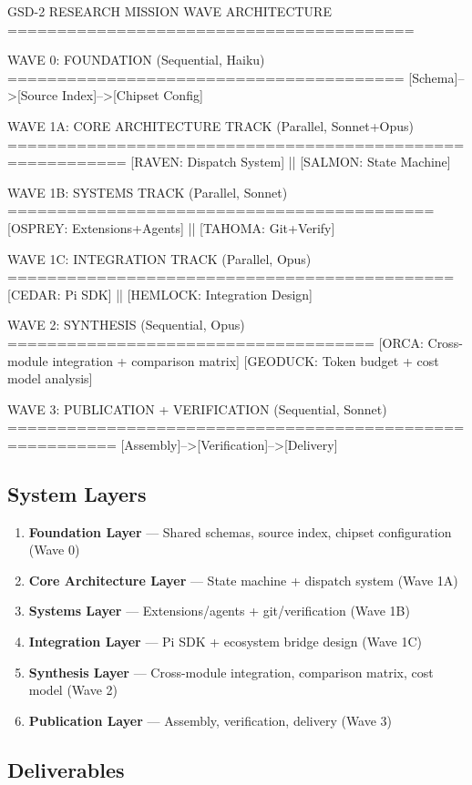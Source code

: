 \documentclass[11pt,letterpaper]{article}
\begin{document}
\begin{asciibox}
GSD-2 RESEARCH MISSION WAVE ARCHITECTURE
=========================================

  WAVE 0: FOUNDATION (Sequential, Haiku)
  ========================================
  [Schema]-->[Source Index]-->[Chipset Config]

  WAVE 1A: CORE ARCHITECTURE TRACK (Parallel, Sonnet+Opus)
  ==========================================================
  [RAVEN: Dispatch System]  ||  [SALMON: State Machine]

  WAVE 1B: SYSTEMS TRACK (Parallel, Sonnet)
  ===========================================
  [OSPREY: Extensions+Agents]  ||  [TAHOMA: Git+Verify]

  WAVE 1C: INTEGRATION TRACK (Parallel, Opus)
  =============================================
  [CEDAR: Pi SDK]  ||  [HEMLOCK: Integration Design]

  WAVE 2: SYNTHESIS (Sequential, Opus)
  =====================================
  [ORCA: Cross-module integration + comparison matrix]
  [GEODUCK: Token budget + cost model analysis]

  WAVE 3: PUBLICATION + VERIFICATION (Sequential, Sonnet)
  =========================================================
  [Assembly]-->[Verification]-->[Delivery]
\end{asciibox}

\subsection{System Layers}

\begin{enumerate}
  \item \textbf{Foundation Layer} --- Shared schemas, source index, chipset configuration (Wave 0)
  \item \textbf{Core Architecture Layer} --- State machine + dispatch system (Wave 1A)
  \item \textbf{Systems Layer} --- Extensions/agents + git/verification (Wave 1B)
  \item \textbf{Integration Layer} --- Pi SDK + ecosystem bridge design (Wave 1C)
  \item \textbf{Synthesis Layer} --- Cross-module integration, comparison matrix, cost model (Wave 2)
  \item \textbf{Publication Layer} --- Assembly, verification, delivery (Wave 3)
\end{enumerate}

\subsection{Deliverables}
\end{document}
